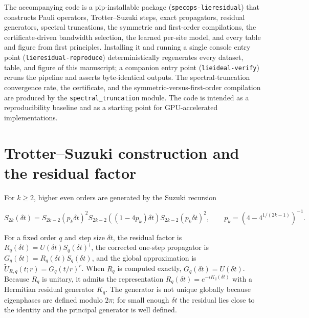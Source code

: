 \documentclass[aps,prxquantum,reprint,superscriptaddress,nofootinbib,amsmath,amssymb]{revtex4-2}
\newcommand{\dt}{\delta t}
\begin{document}
The accompanying code is a pip-installable package (\texttt{specops-lieresidual}) that constructs Pauli operators, Trotter--Suzuki steps, exact propagators, residual generators, spectral truncations, the symmetric and first-order compilations, the certificate-driven bandwidth selection, the learned per-site model, and every table and figure from first principles. Installing it and running a single console entry point (\texttt{lieresidual-reproduce}) deterministically regenerates every dataset, table, and figure of this manuscript; a companion entry point (\texttt{lieideal-verify}) reruns the pipeline and asserts byte-identical outputs. The spectral-truncation convergence rate, the certificate, and the symmetric-versus-first-order compilation are produced by the \texttt{spectral\_truncation} module. The code is intended as a reproducibility baseline and as a starting point for GPU-accelerated implementations.



\appendix

\section{Trotter--Suzuki construction and the residual factor}
\label{app:methods}

For $k\geq2$, higher even orders are generated by the Suzuki recursion
\begin{widetext}
\begin{equation}
    S_{2k}(\dt)=S_{2k-2}(p_k\dt)^2S_{2k-2}((1-4p_k)\dt)S_{2k-2}(p_k\dt)^2,
    \qquad
    p_k=\left(4-4^{1/(2k-1)}\right)^{-1}.
    \label{eq:suzuki-recursion}
\end{equation}
\end{widetext}
For a fixed order $q$ and step size $\dt$, the residual factor is $R_q(\dt)=U(\dt)S_q(\dt)^\dagger$, the corrected one-step propagator is $G_q(\dt)=R_q(\dt)S_q(\dt)$, and the global approximation is $\widetilde U_{R,q}(t;r)=G_q(t/r)^r$. When $R_q$ is computed exactly, $G_q(\dt)=U(\dt)$. Because $R_q$ is unitary, it admits the representation $R_q(\dt)=e^{-iK_q(\dt)}$ with a Hermitian residual generator $K_q$. The generator is not unique globally because eigenphases are defined modulo $2\pi$; for small enough $\dt$ the residual lies close to the identity and the principal generator is well defined.
\end{document}
